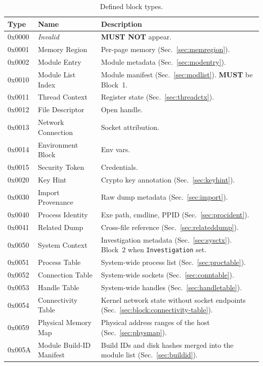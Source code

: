 \documentclass[11pt,a4paper]{article}
\newcommand{\MUST}{\textbf{MUST}}
\newcommand{\MUSTNOT}{\textbf{MUST NOT}}
\newcommand{\field}[1]{\texttt{#1}}
\begin{document}
\begin{table}[H]\centering\caption{Defined block types.}\label{tab:blocktypes}\small
\begin{tabular}{M l p{6.5cm}}\toprule\textbf{Type}&\textbf{Name}&\textbf{Description}\\\midrule
0x0000 & \textit{Invalid} & \MUSTNOT{} appear. \\
0x0001 & Memory Region & Per-page memory (Sec.~\ref{sec:memregion}). \\
0x0002 & Module Entry & Module metadata (Sec.~\ref{sec:modentry}). \\
0x0010 & Module List Index & Module manifest (Sec.~\ref{sec:modlist}). \MUST{} be Block~1. \\
0x0011 & Thread Context & Register state (Sec.~\ref{sec:threadctx}). \\
0x0012 & File Descriptor & Open handle. \\
0x0013 & Network Connection & Socket attribution. \\
0x0014 & Environment Block & Env vars. \\
0x0015 & Security Token & Credentials. \\
0x0020 & Key Hint & Crypto key annotation (Sec.~\ref{sec:keyhint}). \\
0x0030 & Import Provenance & Raw dump metadata (Sec.~\ref{sec:import}). \\
0x0040 & Process Identity & Exe path, cmdline, PPID (Sec.~\ref{sec:procident}). \\
0x0041 & Related Dump & Cross-file reference (Sec.~\ref{sec:relateddump}). \\
0x0050 & System Context & Investigation metadata (Sec.~\ref{sec:sysctx}). Block~2 when \field{Investigation} set. \\
0x0051 & Process Table & System-wide process list (Sec.~\ref{sec:proctable}). \\
0x0052 & Connection Table & System-wide sockets (Sec.~\ref{sec:conntable}). \\
0x0053 & Handle Table & System-wide handles (Sec.~\ref{sec:handletable}). \\
0x0054 & Connectivity Table & Kernel network state without socket endpoints (Sec.~\ref{sec:block:connectivity-table}). \\
0x0059 & Physical Memory Map & Physical address ranges of the host (Sec.~\ref{sec:physmap}). \\
0x005A & Module Build-ID Manifest & Build IDs and disk hashes merged into the module list (Sec.~\ref{sec:buildid}). \\

\end{tabular}
\end{table}
\end{document}
